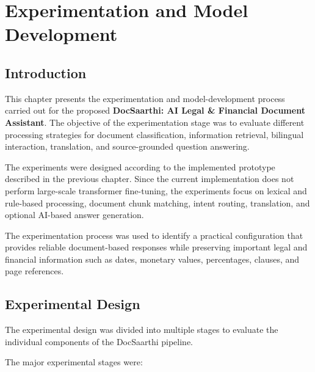 
\chapter{Experimentation and Model Development}
\label{chap:experimentation_model_development}


\section{Introduction}

This chapter presents the experimentation and model-development
process carried out for the proposed
\textbf{DocSaarthi: AI Legal \& Financial Document Assistant}.
The objective of the experimentation stage was to evaluate different
processing strategies for document classification, information
retrieval, bilingual interaction, translation, and
source-grounded question answering.

The experiments were designed according to the implemented prototype
described in the previous chapter. Since the current implementation
does not perform large-scale transformer fine-tuning, the experiments
focus on lexical and rule-based processing, document chunk matching,
intent routing, translation, and optional AI-based answer generation.

The experimentation process was used to identify a practical
configuration that provides reliable document-based responses while
preserving important legal and financial information such as dates,
monetary values, percentages, clauses, and page references.

\section{Experimental Design}

The experimental design was divided into multiple stages to evaluate
the individual components of the DocSaarthi pipeline.

The major experimental stages were:


